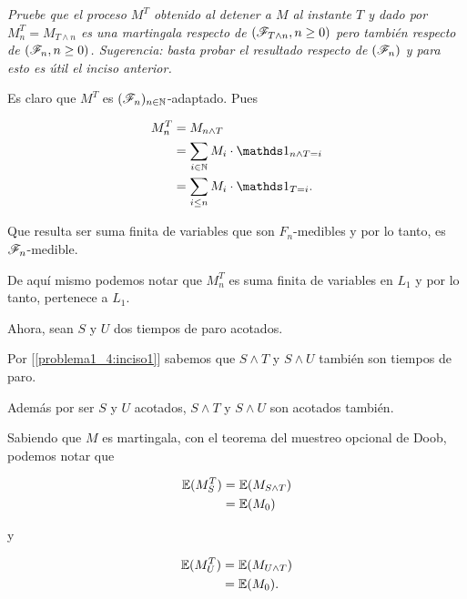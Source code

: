 \emph{
	Pruebe que el proceso $M^T$ obtenido al detener a $M$ al instante $T$ y dado por $M^T_n=M_{T\wedge n}$ es una 
	martingala respecto de $\left( \mathscr{F}_{T\wedge n},n\geq 0\right) $ pero tambi\'en respecto de $\left( \mathscr{F}_{n},n\geq 0\right) $. 
	Sugerencia: basta probar el resultado respecto de $\left( \mathscr{F}_n\right) $ y para esto es \'util el inciso anterior.
}

\afterstatement\par\null

	Es claro que $M^T$ es $(\mathscr{F}_n)_{n \in \mathbb{N}}$-adaptado. Pues
    
	\begin{align}
		M_n^T 		&= 		M_{n \wedge T} 									        \\
					&= 		\sum_{i \in \N} M_i \cdot \indic_{n \wedge T = i}		\\
					&=      \sum_{i \leq n} M_i \cdot \indic_{T = i}.
	\end{align}\par\null		

	Que resulta ser suma finita de variables que son $F_n$-medibles y por lo tanto,
	es $\mathscr{F}_n$-medible.\par\null
	
	De aquí mismo podemos notar que $M_n^T$ es suma finita de variables en $L_1$ y por
	lo tanto, pertenece a $L_1$.\par\null
	
	Ahora, sean $S$ y $U$ dos tiempos de paro acotados.\par\null
	
	Por [\ref{problema1_4:inciso1}] sabemos que $S \wedge T$ y $S \wedge U$ también son tiempos de paro.\par\null
	
	Además por ser $S$ y $U$ acotados, $S \wedge T$ y $S \wedge U$ son acotados también.\par\null

	Sabiendo que $M$ es martingala, con el teorema del muestreo opcional de Doob, podemos notar que
	
	\begin{align}
		\mathbb{E}(M_S^T) 	&=	\mathbb{E}(M_{S \wedge T}) \\
					&= \mathbb{E}(M_0)
	\end{align}\par\null
	
	y
	
	\begin{align}
		\mathbb{E}(M_U^T) 	&=	\mathbb{E}(M_{U \wedge T}) \\
					&= \mathbb{E}(M_0).
	\end{align}\par\null
	
